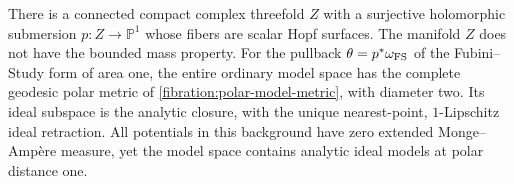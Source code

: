 \begin{example}\label{fibration:unbounded-hopf-threefold}
There is a connected compact complex threefold $Z$ with a
surjective holomorphic submersion $p\colon Z\to\mathbb P^1$ whose
fibers are scalar Hopf surfaces. The manifold $Z$ does not have
the bounded mass property. For the pullback
$\theta=p^*\omega_{\mathrm{FS}}$ of the Fubini--Study form of area one,
the entire ordinary model space has the complete geodesic polar
metric of \cref{fibration:polar-model-metric}, with diameter two.
Its ideal subspace is the analytic closure, with the unique
nearest-point, $1$-Lipschitz ideal retraction. All potentials
in this background have zero extended Monge--Amp\`ere measure,
yet the model space contains analytic ideal models at polar
distance one.
\end{example}
